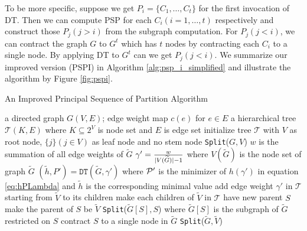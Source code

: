 To be more specific, suppose we get $P_i = \{C_1, \dots, C_t\}$ for the first invocation of DT. Then we can compute PSP for each $C_i(i=1,\dots, t)$ respectively and construct those $P_j(j>i)$ from the subgraph computation. For $P_j(j<i)$, we can contract the graph $G$  to $G^t$ which has $t$ nodes by contracting each $C_i$ to a single node. By applying DT to $G^t$ can we get $P_j(j<i)$. We summarize our improved version (PSPI) in Algorithm \ref{alg:psp_i_simplified} and illustrate the algorithm by Figure \ref{fig:pspi}.

\begin{algorithm}
	\caption{An Improved Principal Sequence of Partition Algorithm}\label{alg:psp_i_simplified}
	\begin{algorithmic}[1]
		\REQUIRE a directed graph $G(V, E)$; edge weight map $c(e)$ for $e\in E$
		\ENSURE a hierarchical tree $\mathcal{T}(K, E)$ where $K \subseteq 2^{V}$ is node set and $E$ is edge set
		\STATE initialize tree $\mathcal{T}$ with $V$ as root node, $\{j\}(j \in V)$ as leaf node and no stem node
		\STATE \texttt{Split}($G, V$)
		\STATE $w$ is the summation of all edge weights of $\widetilde{G}$ 
		\STATE $\gamma' = \frac{w}{\abs{V(\widetilde{G})}-1}$ where $V(\widetilde{G})$ is the node set of graph $\widetilde{G}$ \label{alg:gamma_apostrophe}
		\STATE $(\tilde{h}, P') = \texttt{DT}(\widetilde{G}, \gamma')$ where $\P'$ is the minimizer of $h(\gamma')$ in equation \eqref{eq:hPLambda} and $\tilde{h}$ is the corresponding minimal value  \label{line:DT}
		\STATE add edge weight $\gamma'$ in $\mathcal{T}$ starting from $\widetilde{V}$ to its children
		\ELSE
		\STATE make each children of $\widetilde{V}$ in $\mathcal{T}$ have new parent $S$		
		\STATE make the parent of $S$ be $\widetilde{V}$
		\STATE \texttt{Split}($\widetilde{G}[S], S$) where $\widetilde{G}[S]$ is the subgraph of $\widetilde{G}$ restricted on $S$ \label{line:SplitDown}
		\STATE contract $S$ to a single node in $\widetilde{G}$ %
		\ENDFOR 
		\STATE \texttt{Split}($\widetilde{G}, \widetilde{V}$)		\label{line:SplitUp}
		\ENDIF
		\ENDFUNCTION
	\end{algorithmic}
\end{algorithm}

